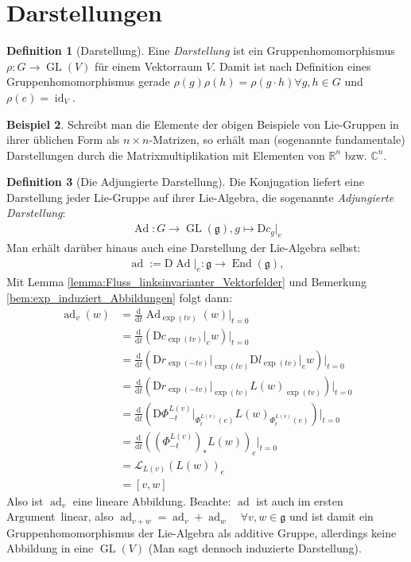 \documentclass[a4paper]{scrbook}
\numberwithin{equation}{chapter}
\newcommand{\D}{\mathrm{d}}
\newcommand{\DD}{\mathrm{D}}
\DeclareMathOperator{\id}{id}
\DeclareMathOperator{\GL}{GL}
\DeclareMathOperator{\End}{End}
\DeclareMathOperator{\Ad}{Ad}
\DeclareMathOperator{\ad}{ad}
\newcommand{\R}{\mathbb{R}}
\theoremstyle{definition}
\newtheorem{defn}{Definition}[section]
\newtheorem{bsp}[defn]{Beispiel}
\begin{document}
	\section{Darstellungen}
		\begin{defn}[Darstellung]
			Eine \emph{Darstellung} ist ein Gruppenhomomorphismus $\rho\colon G\rightarrow \GL(V)$ für einem Vektorraum $V$. Damit ist nach Definition eines Gruppenhomomorphismus gerade $\rho(g)\rho(h)=\rho(g\cdot h) \forall g,h\in G$ und $\rho(e)=\id_V$.
		\end{defn}
		\begin{bsp}
			Schreibt man die Elemente der obigen Beispiele von Lie-Gruppen in ihrer üblichen Form als $n\times n$-Matrizen, so erhält man (sogenannte fundamentale) Darstellungen durch die Matrixmultiplikation mit Elementen von $\R^n$ bzw. $\mathbb{C}^n$.
		\end{bsp}
		\begin{defn}[Die Adjungierte Darstellung]\hfill
			
			Die Konjugation liefert eine Darstellung jeder Lie-Gruppe auf ihrer Lie-Algebra, die sogenannte \emph{Adjungierte Darstellung}:
			\begin{align*}
				\Ad\colon G\rightarrow \GL(\mathfrak{g}), g\mapsto \DD c_g\vert_e
			\end{align*}
			Man erhält darüber hinaus auch eine Darstellung der Lie-Algebra selbst:
			\begin{align*}
				\ad:=\DD\Ad\vert_e\colon\mathfrak{g}\rightarrow\End(\mathfrak{g}),
			\end{align*}
			Mit Lemma \ref{lemma:Fluss_linksinvarianter_Vektorfelder} und Bemerkung \ref{bem:exp_induziert_Abbildungen} folgt dann:
			\begin{align*}
				\ad_v(w)&=\frac{\D}{\D t} \Ad_{\exp(tv)}(w)\Big\vert_{t=0}\\
				&=\frac{\D}{\D t} \left(\DD c_{\exp(tv)}\vert_e w\right)\Big\vert_{t=0}\\
				&=\frac{\D}{\D t} \left(\DD r_{\exp(-tv)}\vert_{\exp(tv)}\DD l_{\exp(tv)}\vert_e w\right)\Big\vert_{t=0}\\
				&=\frac{\D}{\D t} \left(\DD r_{\exp(-tv)}\vert_{\exp(tv)}L(w)_{\exp(tv)}\right)\Big\vert_{t=0}\\
				&=\frac{\D}{\D t} \left(\DD \Phi_{-t}^{L(v)}\vert_{\Phi^{L(v)}_t(e)}L(w)_{\Phi^{L(v)}_t(e)}\right)\Big\vert_{t=0}\\
				&=\frac{\D}{\D t} \left(\left(\Phi_{-t}^{L(v)}\right)_*L(w)\right)_e\Big\vert_{t=0}\\
				&=\mathcal{L}_{L(v)}(L(w))_e\\
				&=\left[v,w\right]
			\end{align*}
			Also ist $\ad_v$ eine lineare Abbildung. Beachte: $\ad$ ist auch \glqq im ersten Argument\grqq\ linear, also $\ad_{v+w}=\ad_v+\ad_w \quad\forall v,w\in\mathfrak{g}$ und ist damit ein Gruppenhomomorphismus der Lie-Algebra als additive Gruppe, allerdings keine Abbildung in eine $\GL(V)$ (Man sagt dennoch \glqq induzierte Darstellung\grqq).
		\end{defn}
\end{document}
